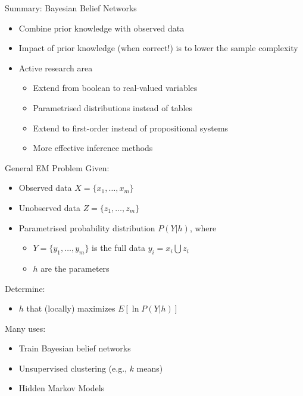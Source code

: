 \documentclass[%
pdf,
colorBG,
slideColor,
tcrico,
]{prosper}
\begin{document}
\begin{slide}{Summary: Bayesian Belief Networks   }  

\begin{itemize}
\item Combine prior knowledge with observed data
\item Impact of prior knowledge (when correct!) is to lower the sample complexity
\item Active research area
\begin{itemize}
\item Extend from boolean to real-valued variables
\item Parametrised distributions instead of tables
\item Extend to first-order instead of propositional systems
\item More effective inference methods
\end{itemize}
\end{itemize}
\end{slide}



\begin{slide}{General  EM Problem   }  
\tiny
Given:
\begin{itemize}
\item Observed data $X=\{x_1, \ldots, x_m\}$
\item Unobserved data $Z=\{z_1, \dots, z_m\}$
\item Parametrised probability distribution $P(Y|h)$, where
\begin{itemize} 
\item $Y=\{y_1, \dots, y_m\}$ is the
full data $y_i = x_i \bigcup z_i$
\item $h$ are the parameters
\end{itemize}
\end{itemize}

Determine:
\begin{itemize}
\item $h$ that (locally) maximizes $E[\ln P(Y|h)]$
\end{itemize}
\vspace*{.2in}
Many uses:
\begin{itemize}
\item Train Bayesian belief networks
\item Unsupervised clustering (e.g., $k$ means)
\item Hidden Markov Models
\end{itemize}
\end{slide}
\end{document}
